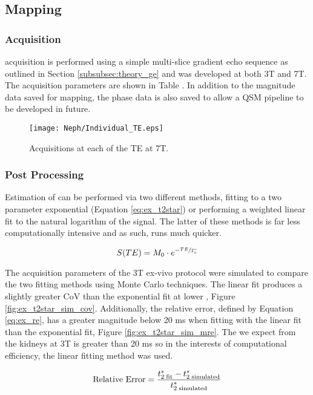 \subsection{\ttwostar Mapping}
\subsubsection{Acquisition}

\ttwostar acquisition is performed using a simple multi-slice gradient echo sequence as outlined in Section \ref{subsubsec:theory_ge} and was developed at both 3T and 7T. The acquisition parameters are shown in Table . In addition to the magnitude data saved for \ttwostar mapping, the phase data is also saved to allow a \ac{QSM} pipeline to be developed in future.

\begin{figure}[H]
	\centering
	\texttt{[image: Neph/Individual\_TE.eps]}
	\caption{Acquisitions at each of the \ac{TE} at 7T.}
	\label{fig:ex_t2star_raw_data}	
\end{figure}

\subsubsection{Post Processing}
Estimation of \ttwostar can be performed via two different methods, fitting to a two parameter exponential (Equation \eqref{eq:ex_t2star}) or performing a weighted linear fit to the natural logarithm of the signal. The latter of these methods is far less computationally intensive and as such, runs much quicker.

\begin{equation}
	S(TE) = M_0 \cdot e^{-\sfrac{TE}{T_2^*}}
	\label{eq:ex_t2star}
\end{equation}

The acquisition parameters of the 3T ex-vivo protocol were simulated to compare the two fitting methods using Monte Carlo techniques. The linear fit produces a slightly greater \ac{CoV} than the exponential fit at lower \ttwostar, Figure \ref{fig:ex_t2star_sim_cov}. Additionally, the relative error, defined by Equation \eqref{eq:ex_re}, has a greater magnitude below 20 ms when fitting with the linear fit than the exponential fit, Figure \ref{fig:ex_t2star_sim_mre}. The \ttwostar we expect from the kidneys at 3T is greater than 20 ms so in the interests of computational efficiency, the linear fitting method was used.

\begin{equation}
	\textup{Relative Error} = \frac{t_{2\; \textup{fit}}^{*} - t_{2\; \textup{simulated}}^{*}}{t_{2\; \textup{simulated}}^{*}}
	\label{eq:ex_re}
\end{equation}

